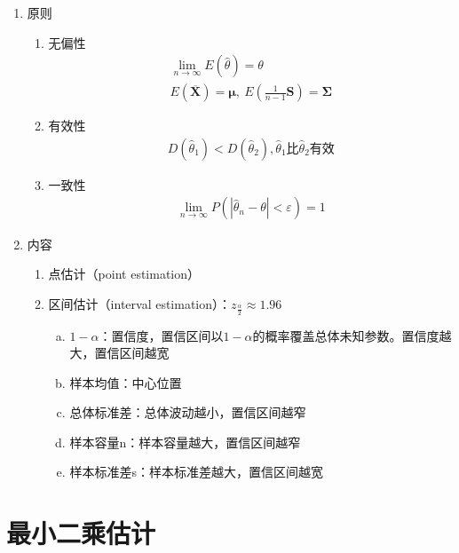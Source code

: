 \documentclass[12pt]{book}
\begin{document}
\begin{enumerate}[1.]
    \item 原则
          \begin{enumerate}[(1)]
              \item 无偏性
                    \begin{gather*}
                        \lim_{n→\infty}{E(\hat{\theta})=\theta } \\
                        E\left(\overline{\bm{X}}\right)=\bm{\mu},\ E\left(\frac{1}{n-1}\bm{S}\right)=\bm{\Sigma}
                    \end{gather*}
              \item 有效性
                    \begin{gather*}
                        D(\hat{\theta}_1)<D(\hat{\theta}_2),\hat{\theta}_1\text{比}\hat{\theta}_2\text{有效}
                    \end{gather*}
              \item 一致性
                    \begin{gather*}
                        \lim_{n\rightarrow\infty}{P\left({\left|{\hat{\theta}}_n-\theta\right|<\varepsilon}\right)}=1
                    \end{gather*}
          \end{enumerate}
    \item 内容
          \begin{enumerate}[(1)]
              \item 点估计（point estimation）
              \item 区间估计（interval estimation）：$z_{\frac{\alpha}{2}}\approx 1.96$
                    \begin{enumerate}[a.]
                        \item $1-\alpha$：置信度，置信区间以$1-\alpha$的概率覆盖总体未知参数。置信度越大，置信区间越宽
                        \item 样本均值：中心位置
                        \item 总体标准差：总体波动越小，置信区间越窄
                        \item 样本容量n：样本容量越大，置信区间越窄
                        \item 样本标准差s：样本标准差越大，置信区间越宽
                    \end{enumerate}
          \end{enumerate}
\end{enumerate}


\section{最小二乘估计}
\end{document}

